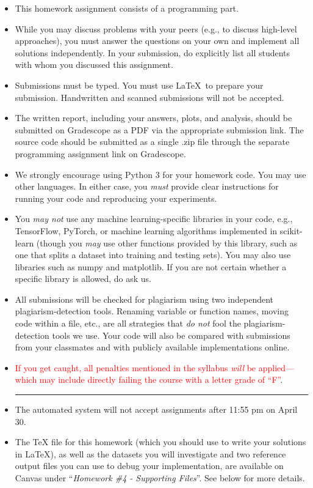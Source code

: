 \documentclass{article}
\begin{document}
\begin{itemize}
    \item This homework assignment consists of a programming part. 
    \item While you may discuss problems with your peers (e.g., to discuss high-level approaches), you must answer the questions on your own and implement all solutions independently. In your submission, do explicitly list all students with whom you discussed this assignment. 
    \item Submissions must be typed. You must use \LaTeX~to prepare your submission. Handwritten and scanned submissions will not be accepted. 
    \item The written report, including your answers, plots, and analysis, should be submitted on Gradescope as a PDF via the appropriate submission link. The source code should be submitted as a single .zip file through the separate programming assignment link on Gradescope.
    \item We strongly encourage using Python 3 for your homework code. You may use other languages. In either case, you \textit{must} provide clear instructions for running your code and reproducing your experiments. 
    \item You \textit{may not} use any machine learning-specific libraries in your code, e.g., TensorFlow, PyTorch, or machine learning algorithms implemented in scikit-learn (though you \textit{may} use other functions provided by this library, such as one that splits a dataset into training and testing sets). You may also use libraries such as numpy and matplotlib. If you are not certain whether a specific library is allowed, do ask us.
    \item All submissions will be checked for plagiarism using two independent plagiarism-detection tools. Renaming variable or function names, moving code within a file, etc., are all strategies that \textit{do not} fool the plagiarism-detection tools we use. Your code will also be compared with submissions from your classmates and with publicly available implementations online. 
    \item \textcolor{red}{If you get caught, all penalties mentioned in the syllabus \textit{will} be applied---which may include directly failing the course with a letter grade of ``F''}.
    
    \vspace{0.3cm}
    \noindent\rule{\linewidth}{0.5pt}
    \vspace{0.025cm}
    \item The automated system will not accept assignments after 11:55 pm on April 30.
    \item The TeX file for this homework (which you should use to write your solutions in \LaTeX), as well as the datasets you will investigate and two reference output files you can use to debug your implementation, are available on Canvas under ``\textit{Homework \#4 - Supporting Files}''. See below for more details.
\end{itemize}
\end{document}
